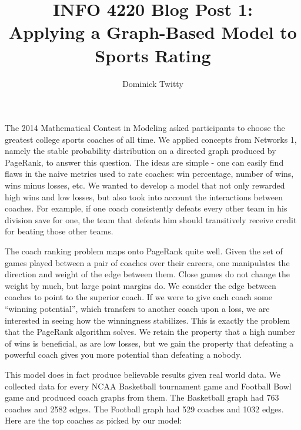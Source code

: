 \documentclass[12pt]{article}
\begin{document}
\title{INFO 4220 Blog Post 1:\\ Applying a Graph-Based Model to Sports Rating}
\author{Dominick Twitty}
\date{}
\maketitle

The 2014 Mathematical Contest in Modeling asked participants to choose the greatest college sports coaches of all time. We applied concepts from Networks 1, namely the stable probability distribution on a directed graph produced by PageRank, to answer this question. The ideas are simple - one can easily find flaws in the naive metrics used to rate coaches: win percentage, number of wins, wins minus losses, etc. We wanted to develop a model that not only rewarded high wins and low losses, but also took into account the interactions between coaches. For example, if one coach consistently defeats every other team in his division save for one, the team that defeats him should transitively receive credit for beating those other teams. 

The coach ranking problem maps onto PageRank quite well. Given the set of games played between a pair of coaches over their careers, one manipulates the direction and weight of the edge between them. Close games do not change the weight by much, but large point margins do. We consider the edge between coaches to point to the superior coach. If we were to give each coach some ``winning potential'', which transfers to another coach upon a loss, we are interested in seeing how the winningness stabilizes. This is exactly the problem that the PageRank algorithm solves. We retain the property that a high number of wins is beneficial, as are low losses, but we gain the property that defeating a powerful coach gives you more potential than defeating a nobody.

This model does in fact produce believable results given real world data. We collected data for every NCAA Basketball tournament game and Football Bowl game and produced coach graphs from them. The Basketball graph had 763 coaches and 2582 edges. The Football graph had 529 coaches and 1032 edges. Here are the top coaches as picked by our model:
\end{document}

